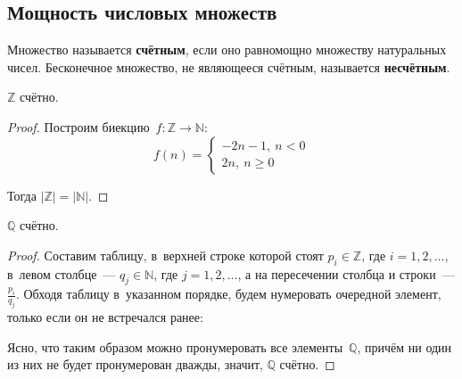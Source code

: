 \subsection{Мощность числовых множеств}
Множество называется \textbf{счётным}, если оно равномощно множеству натуральных чисел.
Бесконечное множество, не являющееся счётным, называется \textbf{несчётным}.

\begin{statement}
$\mathbb Z$ счётно.
\end{statement}
\begin{proof}
Построим биекцию~$f \colon \mathbb Z \to \mathbb N$:
\begin{equation*}
f(n) =
\begin{cases}
-2n - 1, \ n < 0 \\
2n, \ n \geqslant 0
\end{cases}
\end{equation*}

Тогда $|\mathbb Z| = |\mathbb N|$.
\end{proof}

\begin{statement}
$\mathbb Q$ счётно.
\end{statement}
\begin{proof}
Составим таблицу, в~верхней строке которой стоят $p_i \in \mathbb Z$, где $i = 1, 2, \ldots$, в~левом столбце~--- $q_j \in \mathbb N$, где $j = 1, 2, \ldots$, а на пересечении столбца и строки~--- $\frac{p_i}{q_j}$.
Обходя таблицу в~указанном порядке, будем нумеровать очередной элемент, только если он не встречался ранее:


Ясно, что таким образом можно пронумеровать все элементы~$\mathbb Q$, причём ни один из них не будет пронумерован дважды, значит, $\mathbb Q$ счётно.
\end{proof}

